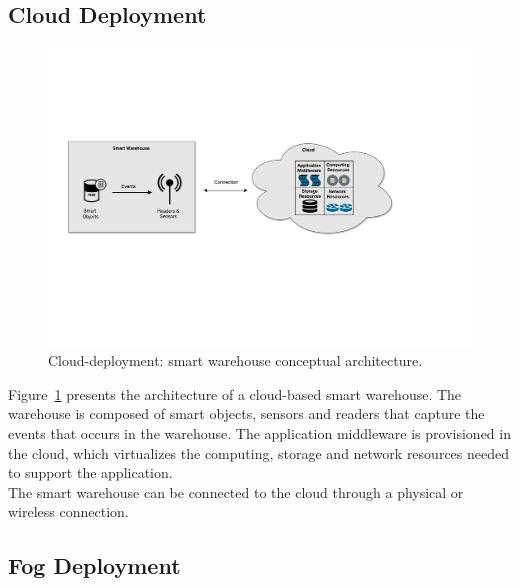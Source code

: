 \subsection{Cloud Deployment}
\label{sub:sol_cloud}

\begin{figure}[ht!]
\centering
\includegraphics[width=\textwidth]{./images/solution_cloud_architecture}
\caption[Cloud-deployment: conceptual architecture.]{Cloud-deployment: smart warehouse conceptual architecture.}
\label{fig:solution_cloud_architecture}
\end{figure}

Figure~\ref{fig:solution_cloud_architecture} presents the architecture of a cloud-based smart warehouse.
The warehouse is composed of smart objects, sensors and readers that capture the events that occurs
in the warehouse. The application middleware is provisioned in the cloud, which virtualizes the computing,
storage and network resources needed to support the application.\\

The smart warehouse can be connected to the cloud through a physical or wireless connection.

\subsection{Fog Deployment}
\label{sub:sol_fog}


